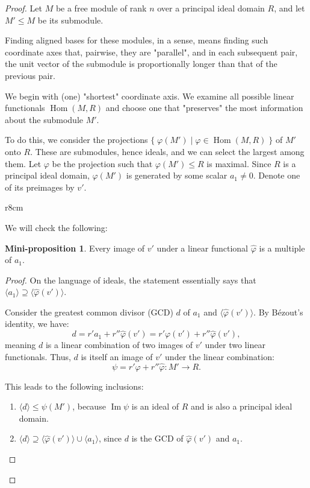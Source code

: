 \documentclass{article}
\newif\ifusemulticols
\newif\ifmobileview
\theoremstyle{definition}
\newtheorem{miniprop}{Mini-proposition}[section]
\theoremstyle{remark}
\theoremstyle{plain}
\theoremstyle{plain}
\newenvironment{mymulticols}
    { \ifusemulticols \begin{multicols}{2} \fi }
    { \ifusemulticols \end{multicols} \fi }
\newcommand\mywrapbegin[3]{\ifmobileview\else\begin{wrapfigure}[#1]{#2}{#3}\fi}
\newcommand\mywrapend{\ifmobileview\else\end{wrapfigure}\fi}
\newcommand\myminipagebegin{\ifmobileview\else\begin{minipage}{\textwidth}\fi}
\DeclareMathOperator{\image}{Im}
\DeclareMathOperator{\Hom}{Hom}
\begin{document}
\begin{mymulticols}
\begin{proof}
    Let $M$ be a free module of rank $n$ over a principal ideal domain $R$, and let $M' \le M$ be
    its submodule.

    Finding aligned bases for these modules, in a sense, means finding such coordinate axes that,
    pairwise, they are "parallel", and in each subsequent pair, the unit
    vector of the submodule is proportionally longer than that of the previous pair.

    We begin with (one) "shortest" coordinate axis. We examine all
    possible linear functionals $\Hom(M, R)$ and choose one that 
    "preserves" the most information about the submodule $M'$.

    To do this, we consider the projections $\{\;\varphi(M') \;|\; \varphi \in \Hom(M,R) \;\}$ of
    $M'$ onto $R$. These are submodules, hence ideals, and we can select the largest among them. 
    Let $\varphi$ be the projection such that $\varphi(M') \le R$ is maximal. Since $R$ is a principal
    ideal domain, $\varphi(M')$ is generated by some scalar $a_1 \neq 0$. Denote one of its preimages by $v'$.

    \mywrapbegin{12}{r}{8cm}
    \mywrapend

    We will check the following:
    \begin{miniprop}
        Every image of $v'$ under a linear functional $\widehat{\varphi}$ is a multiple of $a_1$.
    \end{miniprop}
    \begin{proof}
        On the language of ideals, the statement essentially says that $\langle a_1 \rangle
        \supseteq \langle \widehat{\varphi}(v') \rangle$.

        Consider the greatest common divisor (GCD) $d$ of $a_1$ and $\langle \widehat{\varphi}(v') \rangle$. 
        By Bézout's identity, we have:
        $$d = r' a_1 + r'' \widehat{\varphi}(v') = r' \varphi(v') + r'' \widehat{\varphi}(v'),$$
        meaning $d$ is a linear combination of two images of $v'$ under two linear functionals. 
        Thus, $d$ is itself an image of $v'$ under the linear combination:
        $$\psi = r' \varphi + r'' \widehat{\varphi} : M' \to R.$$

        This leads to the following inclusions:
        \begin{enumerate}
            \item $\langle d \rangle \le \psi(M')$, because $\image \psi$ is an ideal of $R$ and is also a principal ideal domain.
            \item $\langle d \rangle \supseteq \langle \widehat{\varphi}(v') \rangle \cup \langle
                a_1 \rangle$, since $d$ is the GCD of $\widehat{\varphi}(v')$ and $a_1$.
        \end{enumerate}


\end{proof}
\end{proof}
\end{mymulticols}
\end{document}
